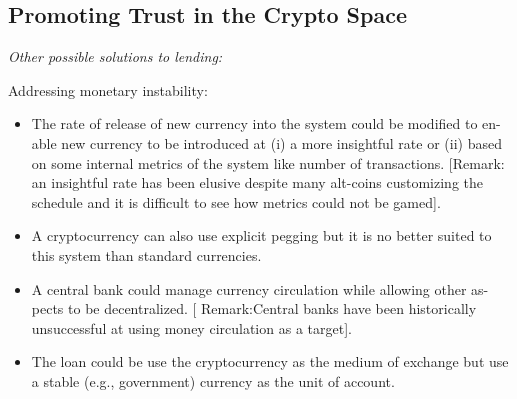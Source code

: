 %
%
%
%





\subsection{Promoting Trust in the Crypto Space}


%
%
%
%
%
%




\textit{Other possible solutions to lending:} ~

Addressing monetary instability:
\begin{itemize}
	\item The rate of release of new currency into the system could be modified to en-
	able new currency to be introduced at (i) a more insightful rate or (ii) based
	on some internal metrics of the system like number of transactions. [Remark:
	an insightful rate has been elusive despite many alt-coins customizing the
	schedule and it is difficult to see how metrics could not be gamed].
	\item A cryptocurrency can also use explicit pegging but it is no better suited to this system than standard currencies.
	\item A central bank could manage currency circulation while allowing other as-
	pects to be decentralized. [	Remark:Central banks have been historically
	unsuccessful at using money circulation as a target].
	\item The loan could be use the cryptocurrency as the medium of exchange but
	use a stable (e.g.,	government) currency as the unit of account.
\end{itemize}

